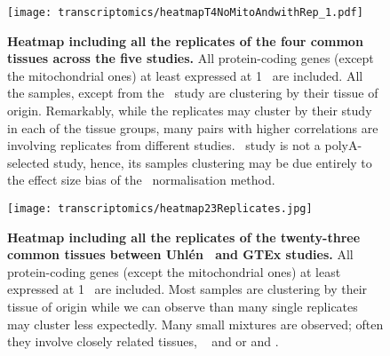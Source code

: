 \begin{figure}[htb]
    \texttt{[image: transcriptomics/heatmapT4NoMitoAndwithRep\_1.pdf]}\centering
    \vspace{-7mm}
    \caption[Heatmap including all the replicates of the 4 common tissues
    across the 5 studies]{\label{fig:noMitoRep4T}\textbf{Heatmap including all
    the replicates of the four common tissues across the five studies.}
    All protein-coding genes (except the mitochondrial ones)
    at least expressed at 1 \FPKM\ are included. All the samples, except from the
    \castle\ study are clustering by their tissue of origin.
    Remarkably, while the replicates may cluster by their study in each of the
    tissue groups, many pairs with higher correlations are involving replicates
    from different studies. \castle\ study is not a polyA-selected study, hence,
    its samples clustering may be due entirely to the effect size bias of the
    \FPKM\ normalisation method.}
\end{figure}

\begin{figure}[htb]
    \texttt{[image: transcriptomics/heatmap23Replicates.jpg]}\centering
    \caption[Heatmap including all the replicates of the 23 common tissues
    between Uhlén and GTEx studies]{\label{fig:noMitoRep23T}\textbf{Heatmap
    including all the replicates of the twenty-three common tissues between
    Uhlén \etal\ and GTEx studies.} All protein-coding genes (except the mitochondrial ones)
    at least expressed at 1 \FPKM\ are included. Most samples are clustering by
    their tissue of origin while we can observe than many single replicates may
    cluster less expectedly. Many small mixtures are observed; often they involve
    closely related tissues, \ie\  and  or
     and .}
\end{figure}



